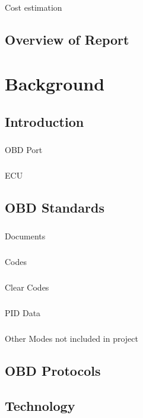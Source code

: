\documentclass[12pt]{report}
\begin{document}
		\paragraph{}
		{
		Cost estimation
		}
		\section{Overview of Report}
	\newpage
	
	\chapter{Background}
		\section{Introduction}
			\paragraph{}{
			OBD Port
			}
			\paragraph{}{
			ECU
			}
		\section{OBD Standards}
			\paragraph{}{
			Documents
			}
			\paragraph{}{
			Codes
			}
			\paragraph{}{
			Clear Codes
			}
			\paragraph{}{
			PID Data
			}
			\paragraph{}{
			Other Modes not included in project
			}
		\section{OBD Protocols}
		\section{Technology}
\end{document}
